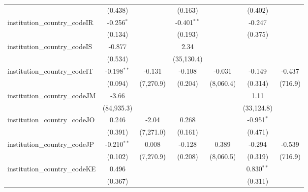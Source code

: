 \begin{tabular}{lcccccc}
                                         & (0.438)        &               & (0.163)        &                & (0.402)        &   \\   
   institution\_country\_codeIR          & -0.256$^{*}$   &               & -0.401$^{**}$  &                & -0.247         &   \\   
                                         & (0.134)        &               & (0.193)        &                & (0.375)        &   \\   
   institution\_country\_codeIS          & -0.877         &               & 2.34           &                &                &   \\   
                                         & (0.534)        &               & (35,130.4)     &                &                &   \\   
   institution\_country\_codeIT          & -0.198$^{**}$  & -0.131        & -0.108         & -0.031         & -0.149         & -0.437\\   
                                         & (0.094)        & (7,270.9)     & (0.204)        & (8,060.4)      & (0.314)        & (716.9)\\   
   institution\_country\_codeJM          & -3.66          &               &                &                & 1.11           &   \\   
                                         & (84,935.3)     &               &                &                & (33,124.8)     &   \\   
   institution\_country\_codeJO          & 0.246          & -2.04         & 0.268          &                & -0.951$^{*}$   &   \\   
                                         & (0.391)        & (7,271.0)     & (0.161)        &                & (0.471)        &   \\   
   institution\_country\_codeJP          & -0.210$^{**}$  & 0.008         & -0.128         & 0.389          & -0.294         & -0.539\\   
                                         & (0.102)        & (7,270.9)     & (0.208)        & (8,060.5)      & (0.319)        & (716.9)\\   
   institution\_country\_codeKE          & 0.496          &               &                &                & 0.830$^{**}$   &   \\   
                                         & (0.367)        &               &                &                & (0.311)        &   \\   

\end{tabular}
